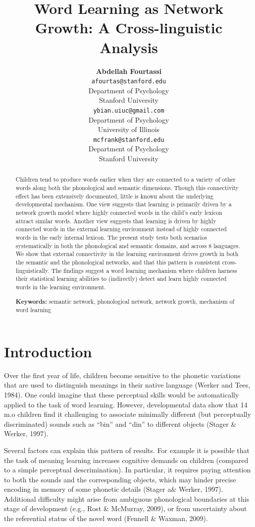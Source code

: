 \documentclass[10pt, letterpaper]{article}
\title{Word Learning as Network Growth: A Cross-linguistic Analysis}
\author{{\large \bf Abdellah Fourtassi} \\ \texttt{afourtas@stanford.edu} \\ Department of Psychology \\ Stanford University \And {\large \bf Yuan Bian} \\ \texttt{ybian.uiuc@gmail.com} \\ Department of Psychology \\ University of Illinois \And {\large \bf Michael C. Frank} \\ \texttt{mcfrank@stanford.edu} \\ Department of Psychology \\ Stanford University}
\begin{document}
\maketitle

\begin{abstract}
Children tend to produce words earlier when they are connected to a
variety of other words along both the phonological and semantic
dimensions. Though this connectivity effect has been extensively
documented, little is known about the underlying developmental
mechanism. One view suggests that learning is primarily driven by a
network growth model where highly connected words in the child's early
lexicon attract similar words. Another view suggests that learning is
driven by highly connected words in the external learning environment
instead of highly connected words in the early internal lexicon. The
present study tests both scenarios systematically in both the
phonological and semantic domains, and across 8 languages. We show that
external connectivity in the learning environment drives growth in both
the semantic and the phonological networks, and that this pattern is
consistent cross-linguistically. The findings suggest a word learning
mechanism where children harness their statistical learning abilities to
(indirectly) detect and learn highly connected words in the learning
environment.

\textbf{Keywords:}
semantic network, phonological network, network growth, mechanism of
word learning
\end{abstract}

\section{Introduction}\label{introduction}

Over the first year of life, children become sensitive to the phonetic
variations that are used to distinguish meanings in their native
language (Werker and Tees, 1984). One could imagine that these
perceptual skills would be automatically applied to the task of word
learning. However, developmental data show that 14 m.o children find it
challenging to associate minimally different (but perceptually
discriminated) sounds such as ``bin'' and ``din'' to different objects
(Stager \& Werker, 1997).

Several factors can explain this pattern of results. For example it is
possible that the task of meaning learning increases cognitive demands
on children (compared to a simple perceptual descrimination). In
particular, it requires paying attention to both the sounds and the
corresponding objects, which may hinder precise encoding in memory of
some phonetic details (Stager a\& Werker, 1997). Additional difficulty
might arise from ambiguous phonological boundaries at this stage of
development (e.g., Rost \& McMurray, 2009), or from uncertainty about
the referential status of the novel word (Fennell \& Waxman, 2009).
\end{document}
